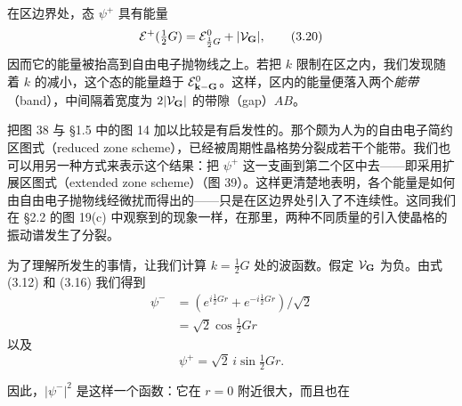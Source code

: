 
在区边界处，态 $\psi^{+}$ 具有能量
\begin{equation*}
\mathcal{E}^{+}(\tfrac{1}{2}G)=\mathcal{E}_{\frac{1}{2}G}^{0}+|\mathcal{V}_{\bf G}|,
\tag{3.20}
\end{equation*}
因而它的能量被抬高到自由电子抛物线之上。若把 $k$ 限制在区之内，我们发现随着 $k$ 的减小，这个态的能量趋于 $\mathcal{E}_{\bf k-{\bf G}}^{0}$。这样，区内的能量便落入两个\emph{能带}（band），中间隔着宽度为 $2|\mathcal{V}_{\bf G}|$ 的带隙（gap）$AB$。

把图 38 与 §1.5 中的图 14 加以比较是有启发性的。那个颇为人为的自由电子简约区图式（reduced zone scheme），已经被周期性晶格势分裂成若干个能带。我们也可以用另一种方式来表示这个结果：把 $\psi^{+}$ 这一支画到第二个区中去——即采用扩展区图式（extended zone scheme）（图 39）。这样更清楚地表明，各个能量是如何由自由电子抛物线经微扰而得出的——只是在区边界处引入了不连续性。这同我们在 §2.2 的图 19(c) 中观察到的现象一样，在那里，两种不同质量的引入使晶格的振动谱发生了分裂。


为了理解所发生的事情，让我们计算 $k=\frac{1}{2}G$ 处的波函数。假定 $\mathcal{V}_{\bf G}$ 为负。由式 (3.12) 和 (3.16) 我们得到
\begin{align*}
\psi^{-}&=(e^{i\frac{1}{2}Gr}+e^{-i\frac{1}{2}Gr})/\sqrt{2}\\
&=\sqrt{2}\cos\tfrac{1}{2}Gr
\tag{3.21}
\end{align*}
以及
\begin{equation*}
\psi^{+}=\sqrt{2}\,i\sin\tfrac{1}{2}Gr.
\tag{3.22}
\end{equation*}

因此，$|\psi^{-}|^{2}$ 是这样一个函数：它在 $r=0$ 附近很大，而且也在
